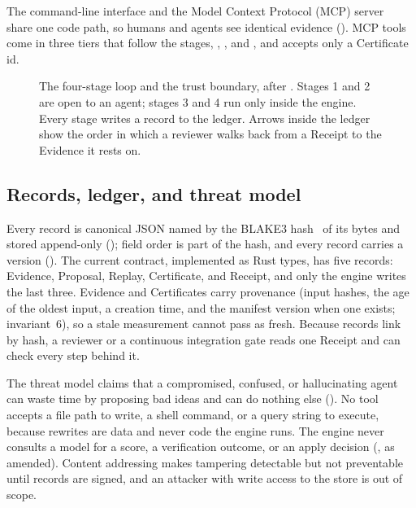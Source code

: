 The command-line interface and the Model Context Protocol (MCP)
server~\cite{mcpspec} share one code path, so humans and agents see identical
evidence (). MCP tools come in three tiers that follow the stages,
, , and , and 
accepts only a Certificate id.

\begin{figure}[t]
  \centering
  
  \caption{The four-stage loop and the trust boundary, after
    . Stages 1 and 2 are open to an agent; stages 3
    and 4 run only inside the engine. Every stage writes a record to the
    ledger. Arrows inside the ledger show the order in which a reviewer walks
    back from a Receipt to the Evidence it rests on.}
  \label{fig:loop}
\end{figure}

\subsection{Records, ledger, and threat model}\label{sec:ledger}

Every record is canonical JSON named by the BLAKE3 hash~\cite{blake3} of its
bytes and stored append-only (); field order is part of the hash, and
every record carries a version (). The current contract,
implemented as Rust types, has five records: Evidence, Proposal, Replay,
Certificate, and Receipt, and only the engine writes the last three. Evidence
and Certificates carry provenance (input hashes, the age of the oldest input, a
creation time, and the manifest version when one exists; invariant~6), so a
stale measurement cannot pass as fresh. Because
records link by hash, a reviewer or a continuous integration gate reads one
Receipt and can check every step behind it.

The threat model claims that a compromised, confused, or hallucinating agent
can waste time by proposing bad ideas and can do nothing else
(). No tool accepts a file path to write, a shell command,
or a query string to execute, because rewrites are data and never code the
engine runs. The engine never consults a model for a score, a verification
outcome, or an apply decision (, as amended). Content addressing makes
tampering detectable but not preventable until records are signed, and an
attacker with write access to the store is out of scope.

